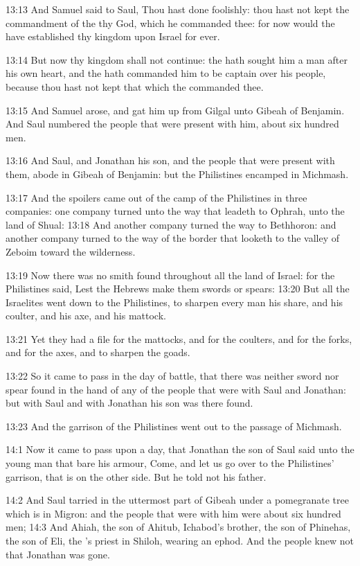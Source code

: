 13:13 And Samuel said to Saul, Thou hast done foolishly: thou hast not kept the commandment of the \LORD thy God, which he commanded thee: for now would the \LORD have established thy kingdom upon Israel for ever.

13:14 But now thy kingdom shall not continue: the \LORD hath sought him a man after his own heart, and the \LORD hath commanded him to be captain over his people, because thou hast not kept that which the \LORD commanded thee.

13:15 And Samuel arose, and gat him up from Gilgal unto Gibeah of Benjamin. And Saul numbered the people that were present with him, about six hundred men.

13:16 And Saul, and Jonathan his son, and the people that were present with them, abode in Gibeah of Benjamin: but the Philistines encamped in Michmash.

13:17 And the spoilers came out of the camp of the Philistines in three companies: one company turned unto the way that leadeth to Ophrah, unto the land of Shual: 13:18 And another company turned the way to Bethhoron: and another company turned to the way of the border that looketh to the valley of Zeboim toward the wilderness.

13:19 Now there was no smith found throughout all the land of Israel: for the Philistines said, Lest the Hebrews make them swords or spears: 13:20 But all the Israelites went down to the Philistines, to sharpen every man his share, and his coulter, and his axe, and his mattock.

13:21 Yet they had a file for the mattocks, and for the coulters, and for the forks, and for the axes, and to sharpen the goads.

13:22 So it came to pass in the day of battle, that there was neither sword nor spear found in the hand of any of the people that were with Saul and Jonathan: but with Saul and with Jonathan his son was there found.

13:23 And the garrison of the Philistines went out to the passage of Michmash.

14:1 Now it came to pass upon a day, that Jonathan the son of Saul said unto the young man that bare his armour, Come, and let us go over to the Philistines' garrison, that is on the other side. But he told not his father.

14:2 And Saul tarried in the uttermost part of Gibeah under a pomegranate tree which is in Migron: and the people that were with him were about six hundred men; 14:3 And Ahiah, the son of Ahitub, Ichabod's brother, the son of Phinehas, the son of Eli, the \LORD's priest in Shiloh, wearing an ephod. And the people knew not that Jonathan was gone.

